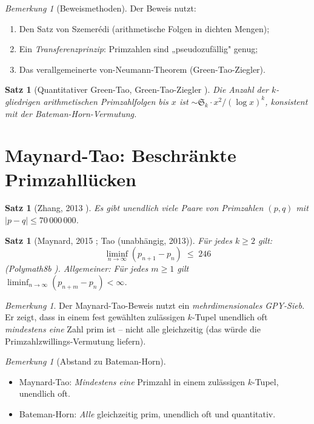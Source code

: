 \documentclass[12pt,a4paper]{amsart}
\newtheorem{satz}[theorem]{Satz}
\theoremstyle{definition}
\theoremstyle{remark}
\newtheorem{bemerkung}[theorem]{Bemerkung}
\newcommand{\BH}{\mathfrak{S}}
\begin{document}
\begin{bemerkung}[Beweismethoden]
  Der Beweis nutzt:
  \begin{enumerate}[label=(\roman*)]
    \item Den Satz von Szemerédi (arithmetische Folgen in dichten Mengen);
    \item Ein \emph{Transferenzprinzip}: Primzahlen sind „pseudozufällig" genug;
    \item Das verallgemeinerte von-Neumann-Theorem (Green-Tao-Ziegler).
  \end{enumerate}
\end{bemerkung}

\begin{satz}[Quantitativer Green-Tao, Green-Tao-Ziegler \cite{GTZ2012}]
  Die Anzahl der $k$-gliedrigen arithmetischen Primzahlfolgen bis $x$ ist
  $\sim \BH_k \cdot x^2 / (\log x)^k$,
  konsistent mit der Bateman-Horn-Vermutung.
\end{satz}

\section{Maynard-Tao: Beschränkte Primzahllücken}\label{sec:maynard}

\begin{satz}[Zhang, 2013 \cite{Zhang2013}]
  Es gibt unendlich viele Paare von Primzahlen $(p,q)$ mit $|p-q| \leq 70\,000\,000$.
\end{satz}

\begin{satz}[Maynard, 2015 \cite{Maynard2015}; Tao (unabhängig, 2013)]
  \label{satz:maynard}
  Für jedes $k \geq 2$ gilt:
  \[
    \liminf_{n\to\infty}(p_{n+1} - p_n) \;\leq\; 246
  \]
  (Polymath8b \cite{Polymath2014}). Allgemeiner:
  Für jedes $m \geq 1$ gilt $\liminf_{n\to\infty}(p_{n+m} - p_n) < \infty$.
\end{satz}

\begin{bemerkung}
  Der Maynard-Tao-Beweis nutzt ein \emph{mehrdimensionales GPY-Sieb}.
  Er zeigt, dass in einem fest gewählten zulässigen $k$-Tupel unendlich oft
  \emph{mindestens eine} Zahl prim ist -- nicht alle gleichzeitig
  (das würde die Primzahlzwillings-Vermutung liefern).
\end{bemerkung}

\begin{bemerkung}[Abstand zu Bateman-Horn]
  \begin{itemize}
    \item Maynard-Tao: \emph{Mindestens eine} Primzahl in einem zulässigen $k$-Tupel,
      unendlich oft.
    \item Bateman-Horn: \emph{Alle} gleichzeitig prim, unendlich oft und quantitativ.
  \end{itemize}
\end{bemerkung}
\end{document}
